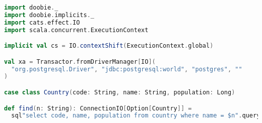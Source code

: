 \begin{lstlisting}[language=Scala]
import doobie._
import doobie.implicits._
import cats.effect.IO
import scala.concurrent.ExecutionContext

implicit val cs = IO.contextShift(ExecutionContext.global)

val xa = Transactor.fromDriverManager[IO](
  "org.postgresql.Driver", "jdbc:postgresql:world", "postgres", ""
)

case class Country(code: String, name: String, population: Long)

def find(n: String): ConnectionIO[Option[Country]] =
  sql"select code, name, population from country where name = $n".query[Country].option
\end{lstlisting}
